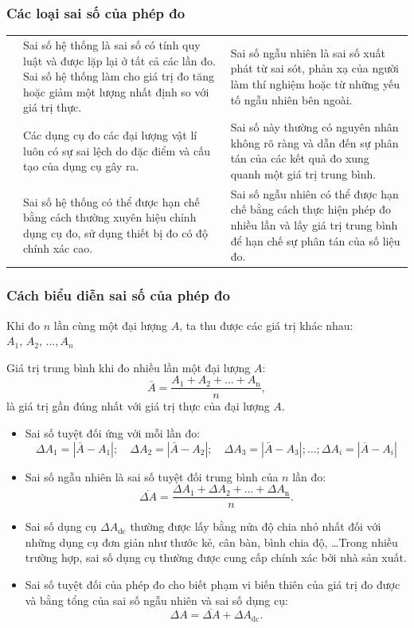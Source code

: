 \subsubsection{Các loại sai số của phép đo}
\begin{center}
	\begin{longtable}{|m{5em}|m{20em}|m{20em}|}
		\hline
		&\thead{Sai số hệ thống} & \thead{Sai số ngẫu nhiên}\\
		\hline
		\text{Khái niệm} & Sai số hệ thống là sai số có tính quy luật và được lặp lại ở tất cả các lần đo. Sai số hệ thống làm cho giá trị đo tăng hoặc giảm một lượng nhất định so với giá trị thực. & Sai số ngẫu nhiên là sai số xuất phát từ sai sót, phản xạ của người làm thí nghiệm hoặc từ những yếu tố ngẫu nhiên bên ngoài.\\
		\hline
		\text{Nguyên nhân} & Các dụng cụ đo các đại lượng vật lí luôn có sự sai lệch do đặc điểm và cấu tạo của dụng cụ gây ra. & Sai số này thường có nguyên nhân không rõ ràng và dẫn đến sự phân tán của các kết quả đo xung quanh một giá trị trung bình.\\
		\hline
		\text{Cách hạn chế} & Sai số hệ thống có thể được hạn chế bằng cách thường xuyên hiệu chỉnh dụng cụ đo, sử dụng thiết bị đo có độ chính xác cao. & Sai số ngẫu nhiên có thể được hạn chế bằng cách thực hiện phép đo nhiều lần và lấy giá trị trung bình để hạn chế sự phân tán của số liệu đo.\\
		\hline
	\end{longtable}
\end{center}
\subsubsection{Cách biểu diễn sai số của phép đo}
Khi đo $n$ lần cùng một đại lượng $A$, ta thu được các giá trị khác nhau: $A_1,\, A_2,\,...,A_n$

Giá trị trung bình khi đo nhiều lần một đại lượng $A$:$$\bar{A}=\dfrac{A_1+A_2+...+A_{\text{n}}}{n},$$
là giá trị gần đúng nhất với giá trị thực của đại lượng $A$.  
\begin{itemize}
	\item Sai số tuyệt đối ứng với mỗi lần đo:
	$$\Delta A_1=|\bar{A}-A_1|;\quad\Delta A_2=|\bar{A}-A_2|;\quad\Delta A_3=|\bar{A}-A_3|;\dots; \Delta A_i=\left|\overline{A}-A_i\right|$$
	\item Sai số ngẫu nhiên là sai số tuyệt đối trung bình của $n$ lần đo:
	$$\overline{\Delta A}=\dfrac{\Delta A_1+\Delta A_2+...+\Delta A_{\textrm{n}} }{n}.$$
	\item Sai số dụng cụ $\Delta A_\text{dc}$ thường được lấy bằng nửa độ chia nhỏ nhất đối với những dụng cụ đơn giản như thước kẻ, cân bàn, bình chia độ, \dots Trong nhiều trường hợp, sai số dụng cụ thường được cung cấp chính xác bởi nhà sản xuất.
	\item Sai số tuyệt đối của phép đo cho biết phạm vi biến thiên của giá trị đo được và bằng tổng của sai số ngẫu nhiên và sai số dụng cụ:
	$$\Delta A= \overline{\Delta A}+ \Delta A_\text{dc}.$$
\end{itemize}
